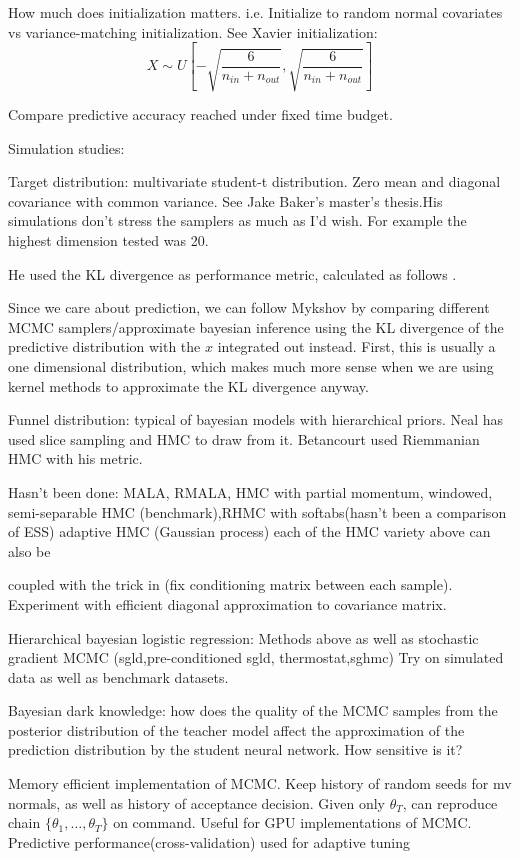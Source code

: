 \documentclass[]{report}
\begin{document}
\begin{enumerate}
How much does initialization matters. i.e. Initialize to random normal covariates vs variance-matching initialization. See Xavier initialization: 
\[X \sim U[- \sqrt{\frac{6}{n_{in}+n_{out}}}, \sqrt{\frac{6}{n_{in}+n_{out}}}] \]

Compare predictive accuracy reached under fixed time budget.

Simulation studies: 

Target distribution: multivariate student-t distribution. Zero mean and diagonal covariance with common variance. See Jake Baker's master's thesis.His simulations don't stress the samplers as much as I'd wish. For example the highest dimension tested was 20. 

He used the KL divergence as performance metric, calculated as follows \cite{boltz2007high}. 

Since we care about prediction, we can follow Mykshov by comparing different MCMC samplers/approximate bayesian inference using the KL divergence of the predictive distribution with the $x$ integrated out instead. First, this is usually a one dimensional distribution, which makes much more sense when we are using kernel methods to approximate the KL divergence anyway.

Funnel distribution: typical of bayesian models with hierarchical priors. Neal has used slice sampling and HMC to draw from it. Betancourt used Riemmanian HMC with his metric. 

Hasn't been done: MALA, RMALA, HMC with partial momentum, windowed,
semi-separable HMC (benchmark),RHMC with softabs(hasn't been a comparison of
ESS) adaptive HMC (Gaussian process) each of the HMC variety above can also be

coupled with the trick in \cite{burda2011bayesian} (fix conditioning matrix
between each sample).
Experiment with efficient diagonal approximation to covariance matrix.

Hierarchical bayesian logistic regression: Methods above as well as stochastic
gradient MCMC (sgld,pre-conditioned sgld, thermostat,sghmc)
Try on simulated data as well as benchmark datasets.


Bayesian dark knowledge: how does the quality of the MCMC samples from the
posterior distribution of the teacher model affect the approximation of the
prediction distribution by the student neural network. How sensitive is it?


Memory efficient implementation of MCMC.
Keep history of random seeds for mv normals, as well as history of acceptance
decision.
Given only $\theta_T$, can reproduce chain $\{\theta_1, \dots, \theta_T \}$ on
command.
Useful for GPU implementations of MCMC.
Predictive performance(cross-validation) used for adaptive
tuning\cite{wang2013adaptive}



\end{enumerate}
\end{document}
